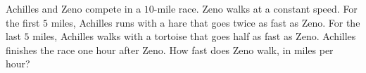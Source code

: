Achilles and Zeno compete in a $10$-mile race. Zeno walks at a constant speed. For the first $5$ miles, Achilles runs with a hare that goes twice as fast as Zeno. For the last $5$ miles, Achilles walks with a tortoise that goes half as fast as Zeno. Achilles finishes the race one hour after Zeno. How fast does Zeno walk, in miles per hour?
